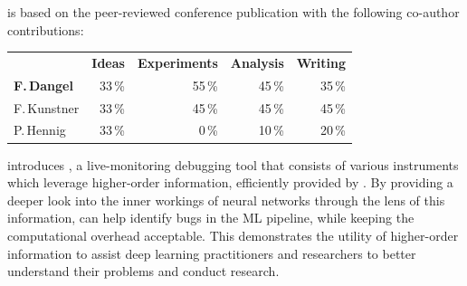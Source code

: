 \begin{disclaimer}
   is based on the peer-reviewed
  conference publication with the following co-author contributions:

   \cite{dangel2020backpack}

  \vspace{-1.75ex}

  \begin{center}
    \begin{tabular}[!h]{lrrrr}
      & \textbf{Ideas} & \textbf{Experiments} & \textbf{Analysis} & \textbf{Writing}
      \\
      \textbf{F.\,Dangel} & 33\,\% & 55\,\% & 45\,\% & 35\,\%
      \\
      F.\,Kunstner & 33\,\%& 45\,\% & 45\,\% & 45\,\%
      \\
      P.\,Hennig & 33\,\% & 0\,\% & 10\,\% & 20\,\%
    \end{tabular}
  \end{center}
\end{disclaimer}

introduces \cockpit, a live-monitoring debugging tool that consists of various
instruments which leverage higher-order information, efficiently provided by
\backpack. By providing a deeper look into the inner workings of neural networks
through the lens of this information, \cockpit can help identify bugs in the ML
pipeline, while keeping the computational overhead acceptable. This demonstrates
the utility of higher-order information to assist deep learning practitioners
and researchers to better understand their problems and conduct research.

